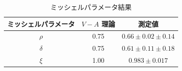 \begin{table}[bht]
\centering
\caption{ミッシェルパラメータ結果}
\begin{tabular}{ccc} \toprule
ミッシェルパラメータ & $V - A$ 理論 & 測定値 \\ \midrule
$\rho$   & 0.75 & $0.66\pm0.02\pm0.14$ \\
$\delta$ & 0.75 & $0.61\pm0.11\pm0.18$ \\
$\xi$    & 1.00 & $0.983\pm0.017$\\ \bottomrule
\end{tabular}
\label{hatano_tab:michel}
\end{table}

%
